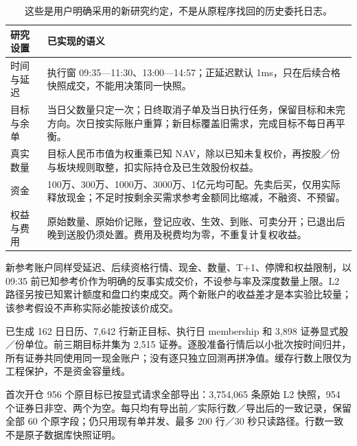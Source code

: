 \begin{table}[H]\centering\small
\begin{tabularx}{\linewidth}{p{31mm}Y}
\toprule 研究设置 & 已实现的语义\\\midrule
时间与延迟 & 执行窗 09:35—11:30、13:00—14:57；正延迟默认 1ms，只在后续合格快照成交，不能用决策同一快照。\\
目标与余单 & 当日父数量只定一次；日终取消子单及当日执行任务，保留目标和未完方向。次日按实际账户重算；新目标覆盖旧需求，完成目标不每日再平衡。\\
真实数量 & 目标人民币市值为权重乘已知 NAV，除以已知未复权价，再按股／份与板块规则取整，扣实际持仓及已生效股份权益。\\
资金 & 100万、300万、1000万、3000万、1亿元均可配。先卖后买，仅用实际释放现金；不足时按剩余买需求参考金额同比缩减，不融资、不预留。\\
权益与费用 & 原始数量、原始价记账，登记应收、生效、到账、可卖分开；已退出后晚到送股仍须处置。费用及税费均为零，不重复计复权收益。\\
\bottomrule
\end{tabularx}
\caption{这些是用户明确采用的新研究约定，不是从原程序找回的历史委托日志。}
\end{table}

新参考账户同样受延迟、后续资格行情、现金、数量、T+1、停牌和权益限制，以 09:35 前已知参考价作为明确的反事实成交价，不设参与率及深度数量上限。L2 路径另按已知累计额度和盘口约束成交。两个新账户的收益差才是本实验比较量；该参考假设不声称实际必能按该价成交。

已生成 162 日日历、7,642 行新正目标、执行日 membership 和 3,898 证券显式股／份单位。前三期目标并集为 2,515 证券。逐股准备行情后以小批次按时间归并，所有证券共同使用同一现金账户；没有逐只独立回测再拼净值。缓存行数上限仅为工程保护，不是资金容量线。

\clearpage
{}
首次开仓 956 个原目标已按显式请求全部导出：3,754,065 条原始 L2 快照，954 个证券日非空、两个为空。每只均有导出前／实际行数／导出后的一致记录，保留全部 60 个原字段；仍只用现有单并发、最多 200 行／30 秒只读路径。行数一致不是原子数据库快照证明。


